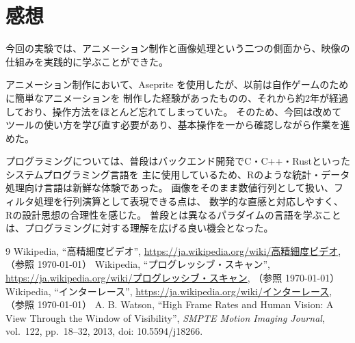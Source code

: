 \documentclass[12pt,a4paper]{ltjsarticle}
\begin{document}
\section{感想}\label{sec:impressions}

今回の実験では、アニメーション制作と画像処理という二つの側面から、映像の仕組みを実践的に学ぶことができた。

アニメーション制作において、Aseprite を使用したが、以前は自作ゲームのために簡単なアニメーションを
制作した経験があったものの、それから約2年が経過しており、操作方法をほとんど忘れてしまっていた。
そのため、今回は改めてツールの使い方を学び直す必要があり、基本操作を一から確認しながら作業を進めた。

プログラミングについては、普段はバックエンド開発でC・C++・Rustといったシステムプログラミング言語を
主に使用しているため、Rのような統計・データ処理向け言語は新鮮な体験であった。
画像をそのまま数値行列として扱い、フィルタ処理を行列演算として表現できる点は、
数学的な直感と対応しやすく、Rの設計思想の合理性を感じた。
普段とは異なるパラダイムの言語を学ぶことは、プログラミングに対する理解を広げる良い機会となった。

\begin{thebibliography}{9}
    Wikipedia,
    ``高精細度ビデオ'',
    \url{https://ja.wikipedia.org/wiki/高精細度ビデオ},
    （参照 \today）
    Wikipedia,
    ``プログレッシブ・スキャン'',
    \url{https://ja.wikipedia.org/wiki/プログレッシブ・スキャン},
    （参照 \today）
    Wikipedia,
    ``インターレース'',
    \url{https://ja.wikipedia.org/wiki/インターレース},
    （参照 \today）
    A. B. Watson,
    ``High Frame Rates and Human Vision: A View Through the Window of Visibility'',
    \textit{SMPTE Motion Imaging Journal}, vol.~122, pp.~18--32, 2013,
    doi: 10.5594/j18266.
\end{thebibliography}
\end{document}
